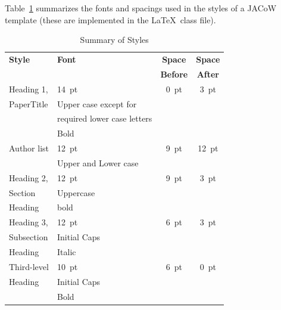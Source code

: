 \documentclass[a4paper]{jacow}
\begin{document}
Table~\ref{style-tab} summarizes the fonts and spacings used in the styles of
a JACoW template (these are implemented in the \LaTeX\ class file).
\begin{table}[h!t]
    \setlength\tabcolsep{4pt}
    \caption{Summary of Styles}
    \label{style-tab}
    \begin{tabular}{@{}llcc@{}}
        \toprule
        \textbf{Style} & \textbf{Font}               & \textbf{Space}  & \textbf{Space} \\
                       &                             & \textbf{Before} & \textbf{After} \\
        \midrule
         Heading 1,    & \SI{14}{pt}                 & \SI{0}{pt}      & \SI{3}{pt}  \\
          PaperTitle   & Upper case except for       &                 &      \\
                       & required lower case letters &                 &      \\   %
                       & Bold                        &                 &      \\
         \midrule
          Author list  & \SI{12}{pt}                 & \SI{9}{pt}      & \SI{12}{pt} \\
                       & Upper and Lower case        &                 &      \\
         \midrule
         Heading 2,    & \SI{12}{pt}                 & \SI{9}{pt}      & \SI{3}{pt}  \\
         Section       & Uppercase                   &                 &      \\
         Heading       & bold                        &                 &      \\
        \midrule
         Heading 3,    & \SI{12}{pt}                 & \SI{6}{pt}      & \SI{3}{pt}  \\
         Subsection    & Initial Caps                &                 &      \\
         Heading       & Italic                      &                 &      \\
        \midrule
         Third-level   & \SI{10}{pt}                 & \SI{6}{pt}           & \SI{0}{pt}  \\
         Heading       & Initial Caps                &                 &      \\
                       & Bold                        &                 &      \\

\end{tabular}
\end{table}
\end{document}

